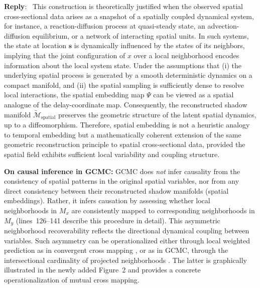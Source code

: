 \documentclass[11pt]{article}
\newenvironment{reply}
   {\medskip \noindent \color{blue} \begin{sf}\textbf{Reply}:\  }
   {\medskip \par \end{sf}}
\begin{document}
\begin{reply}
This construction is theoretically justified when the observed spatial cross-sectional data arises as a snapshot of a spatially coupled dynamical system, for instance, a reaction-diffusion process at quasi-steady state, an advection-diffusion equilibrium, or a network of interacting spatial units. In such systems, the state at location $\mathbf{s}$ is dynamically influenced by the states of its neighbors, implying that the joint configuration of $x$ over a local neighborhood encodes information about the local system state. Under the assumptions that (i) the underlying spatial process is generated by a smooth deterministic dynamics on a compact manifold, and (ii) the spatial sampling is sufficiently dense to resolve local interactions, the spatial embedding map $\Psi$ can be viewed as a spatial analogue of the delay-coordinate map. Consequently, the reconstructed shadow manifold $\tilde{\mathcal{M}}_{\text{spatial}}$ preserves the geometric structure of the latent spatial dynamics, up to a diffeomorphism. Therefore, spatial embedding is not a heuristic analogy to temporal embedding but a mathematically coherent extension of the same geometric reconstruction principle to spatial cross-sectional data, provided the spatial field exhibits sufficient local variability and coupling structure.

\textbf{On causal inference in GCMC:}  
GCMC does \textit{not} infer causality from the consistency of spatial patterns in the original spatial variables, nor from any direct consistency between their reconstructed shadow manifolds (spatial embeddings). Rather, it infers causation by assessing whether local neighborhoods in \(M_x\) are consistently mapped to corresponding neighborhoods in \(M_y\) (lines~126--141 describe this procedure in detail). This asymmetric neighborhood recoverability reflects the directional dynamical coupling between variables. Such asymmetry can be operationalized either through local weighted prediction as in convergent cross mapping \citep{sugihara1990simplex,sugihara2012ccm}, or as in GCMC, through the intersectional cardinality of projected neighborhoods \citep{tao2023cmc}. The latter is graphically illustrated in the newly added Figure~2 and provides a concrete operationalization of mutual cross mapping.


\end{reply}
\end{document}
